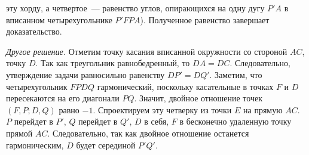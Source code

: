 эту хорду, а четвертое~--- равенство углов, опирающихся на одну дугу $P'A$
в вписанном четырехугольнике $P'FPA$).
Полученное равенство завершает доказательство.
\par
\emph{Другое решение.}
Отметим точку касания вписанной окружности со стороной $AC$, точку $D$.
Так как треугольник равнобедренный, то $DA = DC$.
Следовательно, утверждение задачи равносильно равенству $DP' = DQ'$.
Заметим, что четырехугольник $FPDQ$ гармонический, поскольку касательные в
точках $F$ и $D$ пересекаются на его диагонали $PQ$.
Значит, двойное отношение точек $(F, P; D, Q)$ равно $-1$.
Спроектируем эту четверку из точки $E$ на прямую $AC$.
$P$ перейдет в $P'$, $Q$ перейдет в $Q'$, $D$ в себя, $F$ в бесконечно
удаленную точку прямой $AC$.
Следовательно, так как двойное отношение останется гармоническим, $D$ будет
серединой $P'Q'$.
\fi %
\endproblem
